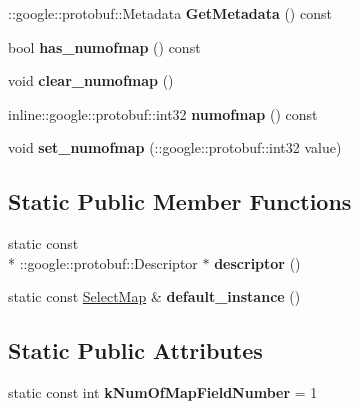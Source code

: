 \begin{DoxyCompactItemize}
\item 
\hypertarget{class_select_map_a6f0e3f4a17b808cfa28f50b761a832dd}{\-::google\-::protobuf\-::\-Metadata {\bfseries Get\-Metadata} () const }\label{class_select_map_a6f0e3f4a17b808cfa28f50b761a832dd}

\item 
\hypertarget{class_select_map_acbee86909008218756c875291f41a24c}{bool {\bfseries has\-\_\-numofmap} () const }\label{class_select_map_acbee86909008218756c875291f41a24c}

\item 
\hypertarget{class_select_map_ac7edf514f8e7f66dcc5d8bfbc586cad1}{void {\bfseries clear\-\_\-numofmap} ()}\label{class_select_map_ac7edf514f8e7f66dcc5d8bfbc586cad1}

\item 
\hypertarget{class_select_map_a68740fcce2df53fa898d0703cf7d33a7}{inline\-::google\-::protobuf\-::int32 {\bfseries numofmap} () const }\label{class_select_map_a68740fcce2df53fa898d0703cf7d33a7}

\item 
\hypertarget{class_select_map_aee810901a8840191d4b39ec7d53cb9cb}{void {\bfseries set\-\_\-numofmap} (\-::google\-::protobuf\-::int32 value)}\label{class_select_map_aee810901a8840191d4b39ec7d53cb9cb}

\end{DoxyCompactItemize}
\subsection*{Static Public Member Functions}
\begin{DoxyCompactItemize}
\item 
\hypertarget{class_select_map_a58714ef601b494a6f7b53446fd7ae3c4}{static const \\*
\-::google\-::protobuf\-::\-Descriptor $\ast$ {\bfseries descriptor} ()}\label{class_select_map_a58714ef601b494a6f7b53446fd7ae3c4}

\item 
\hypertarget{class_select_map_a33c33429463ad7c416b16e6af042c791}{static const \hyperlink{class_select_map}{Select\-Map} \& {\bfseries default\-\_\-instance} ()}\label{class_select_map_a33c33429463ad7c416b16e6af042c791}

\end{DoxyCompactItemize}
\subsection*{Static Public Attributes}
\begin{DoxyCompactItemize}
\item 
\hypertarget{class_select_map_a82d1599ce39896be4446fdc47fd087b4}{static const int {\bfseries k\-Num\-Of\-Map\-Field\-Number} = 1}\label{class_select_map_a82d1599ce39896be4446fdc47fd087b4}

\end{DoxyCompactItemize}
